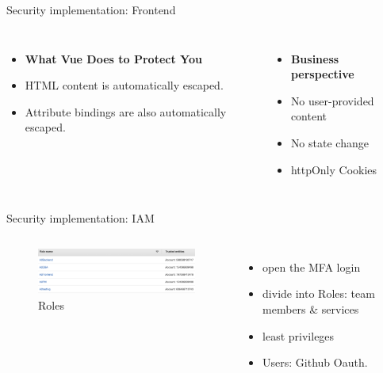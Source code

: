 \documentclass[aspectratio=169]{beamer}
\begin{document}
\begin{frame}[fragile]{Security implementation: Frontend}

  \begin{columns}
	  \begin{itemize}
		  \item \textbf{What Vue Does to Protect You}
        \pause
        \item HTML content is automatically escaped.
        \item Attribute bindings are also automatically escaped.
      \end{itemize}

      \begin{itemize}
		  \item \textbf{Business perspective}
		\pause
        \item No user-provided content
        \pause
        \item No state change
		\pause
		\item httpOnly Cookies
      \end{itemize}
  \end{columns}

\end{frame}

\begin{frame}[fragile]{Security implementation: IAM}

  \begin{columns}
      \begin{figure}[htbp]
        \centerline{\includegraphics[width=220pt]{images/roles.png}}
        \caption{Roles}
        \label{roles}
      \end{figure}
      \begin{itemize}
        \item open the MFA login
        \item divide into Roles: team members \& services
        \item least privileges
        \pause
        \item Users: Github Oauth.
      \end{itemize}
  \end{columns}

\end{frame}
\end{document}
